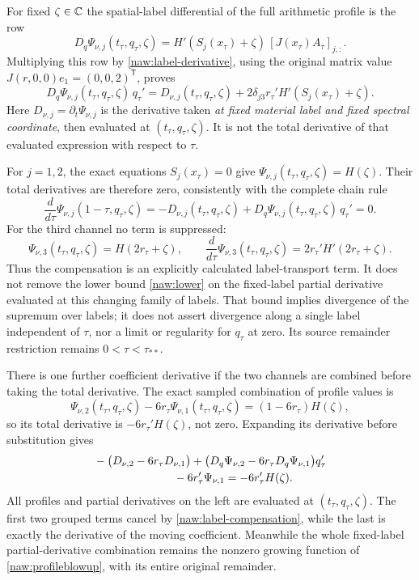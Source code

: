 For fixed $\zeta\in\mathbb C$ the spatial-label differential of the full
arithmetic profile is the row
\[
 D_q\Psi_{\nu,j}(t_\tau,q_\tau,\zeta)
 =H'(S_j(x_\tau)+\zeta)\,[J(x_\tau)A_\tau]_{j,:}.
\]
Multiplying this row by \eqref{naw:label-derivative}, using the original
matrix value $J(r,0,0)e_1=(0,0,2)^{\mathsf T}$, proves
\begin{equation}\label{naw:label-compensation}
 D_q\Psi_{\nu,j}(t_\tau,q_\tau,\zeta)\,q_\tau'
 =D_{\nu,j}(t_\tau,q_\tau,\zeta)
       +2\delta_{j3}r_\tau' H'(S_j(x_\tau)+\zeta).
\end{equation}
Here $D_{\nu,j}=\partial_t\Psi_{\nu,j}$ is the derivative taken
\emph{at fixed material label and fixed spectral coordinate}, then
evaluated at $(t_\tau,q_\tau,\zeta)$. It is not the total derivative
of that evaluated expression with respect to $\tau$.

For $j=1,2$, the exact equations $S_j(x_\tau)=0$ give
$\Psi_{\nu,j}(t_\tau,q_\tau,\zeta)=H(\zeta)$. Their total derivatives
are therefore zero, consistently with the complete chain rule
\[
 \frac{d}{d\tau}\Psi_{\nu,j}(1-\tau,q_\tau,\zeta)
 =-D_{\nu,j}(t_\tau,q_\tau,\zeta)
       +D_q\Psi_{\nu,j}(t_\tau,q_\tau,\zeta)\,q_\tau'=0 .
\]
For the third channel no term is suppressed:
\[
 \Psi_{\nu,3}(t_\tau,q_\tau,\zeta)=H(2r_\tau+\zeta),\qquad
 \frac{d}{d\tau}\Psi_{\nu,3}(t_\tau,q_\tau,\zeta)
                 =2r_\tau'H'(2r_\tau+\zeta).
\]
Thus the compensation is an explicitly calculated label-transport
term. It does not remove the lower bound \eqref{naw:lower} on the
fixed-label partial derivative evaluated at this changing family of
labels. That bound implies divergence of the supremum over labels;
it does not assert divergence along a single label independent of
$\tau$, nor a limit or regularity for $q_\tau$ at zero.
Its source remainder restriction remains $0<\tau<\tau_{**}$.

There is one further coefficient derivative if the two channels are
combined before taking the total derivative. The exact sampled
combination of profile values is
\[
 \Psi_{\nu,2}(t_\tau,q_\tau,\zeta)
       -6r_\tau\Psi_{\nu,1}(t_\tau,q_\tau,\zeta)
       =(1-6r_\tau)H(\zeta),
\]
so its total derivative is $-6r_\tau'H(\zeta)$, not zero. Expanding
its derivative before substitution gives
\[
 \begin{split}
 &-\bigl(D_{\nu,2}-6r_\tau D_{\nu,1}\bigr)
 +\bigl(D_q\Psi_{\nu,2}
                 -6r_\tau D_q\Psi_{\nu,1}\bigr)q_\tau'\\
 &\hspace{25mm}-6r_\tau'\Psi_{\nu,1}
       =-6r_\tau'H(\zeta).
 \end{split}
\]
All profiles and partial derivatives on the left are evaluated at
$(t_\tau,q_\tau,\zeta)$. The first two grouped terms cancel by
\eqref{naw:label-compensation}, while the last is exactly the
derivative of the moving coefficient. Meanwhile the whole fixed-label
partial-derivative combination remains the nonzero growing function
of \eqref{naw:profileblowup}, with its entire original remainder.
